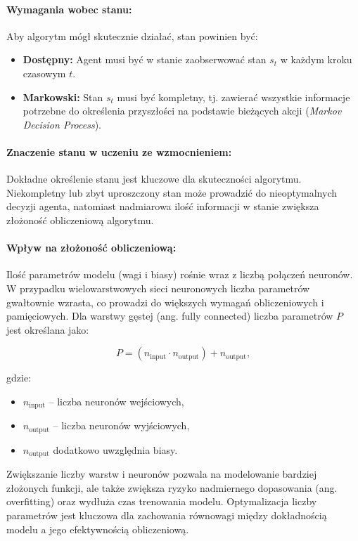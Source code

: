 \paragraph{Wymagania wobec stanu:}
Aby algorytm mógł skutecznie działać, stan powinien być:
\begin{itemize}
	\item \textbf{Dostępny:} Agent musi być w stanie zaobserwować stan \( s_t \) w każdym kroku czasowym \( t \).
	\item \textbf{Markowski:} Stan \( s_t \) musi być kompletny, tj. zawierać wszystkie informacje potrzebne do określenia przyszłości na podstawie bieżących akcji (\emph{Markov Decision Process}\cite{PUTERMAN1994}).
\end{itemize}

\paragraph{Znaczenie stanu w uczeniu ze wzmocnieniem:}
Dokładne określenie stanu jest kluczowe dla skuteczności algorytmu. Niekompletny lub zbyt uproszczony stan może prowadzić do nieoptymalnych decyzji agenta, natomiast nadmiarowa ilość informacji w stanie zwiększa złożoność obliczeniową algorytmu.

\paragraph{Wpływ na złożoność obliczeniową:}
Ilość parametrów modelu (wagi i biasy) rośnie wraz z liczbą połączeń neuronów. W przypadku wielowarstwowych sieci neuronowych liczba parametrów gwałtownie wzrasta, co prowadzi do większych wymagań obliczeniowych i pamięciowych. Dla warstwy gęstej (ang. fully connected) liczba parametrów \(P\) jest określana jako:

\[
	P = (n_{\text{input}} \cdot n_{\text{output}}) + n_{\text{output}},
\]

gdzie:
\begin{itemize}
	\item \(n_{\text{input}}\) – liczba neuronów wejściowych,
	\item \(n_{\text{output}}\) – liczba neuronów wyjściowych,
	\item \(n_{\text{output}}\) dodatkowo uwzględnia biasy.
\end{itemize}

Zwiększanie liczby warstw i neuronów pozwala na modelowanie bardziej złożonych funkcji, ale także zwiększa ryzyko nadmiernego dopasowania (ang. overfitting) oraz wydłuża czas trenowania modelu. Optymalizacja liczby parametrów jest kluczowa dla zachowania równowagi między dokładnością modelu a jego efektywnością obliczeniową.

